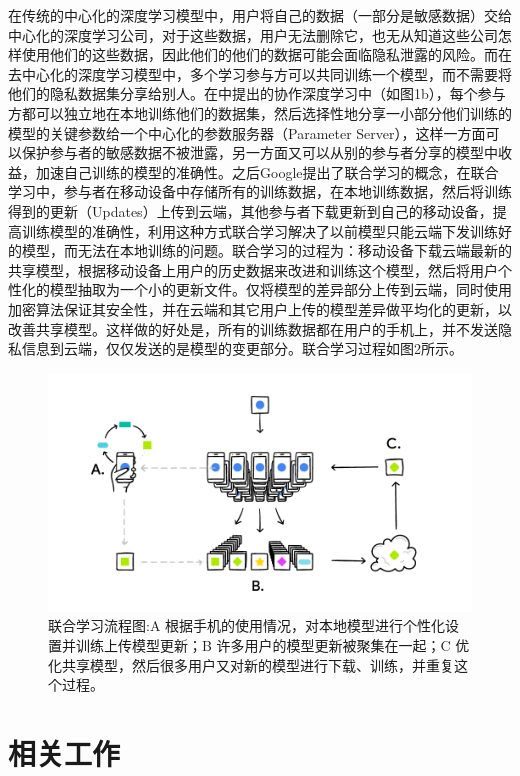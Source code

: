 \documentclass[a4paper]{article}
\begin{document}
在传统的中心化的深度学习模型中，用户将自己的数据（一部分是敏感数据）交给中心化的深度学习公司，对于这些数据，用户无法删除它，也无从知道这些公司怎样使用他们的这些数据，因此他们的他们的数据可能会面临隐私泄露的风险。而在去中心化的深度学习模型中，多个学习参与方可以共同训练一个模型，而不需要将他们的隐私数据集分享给别人。在\cite{shokri2015privacy}中提出的协作深度学习中（如图1b），每个参与方都可以独立地在本地训练他们的数据集，然后选择性地分享一小部分他们训练的模型的关键参数给一个中心化的参数服务器（Parameter Server），这样一方面可以保护参与者的敏感数据不被泄露，另一方面又可以从别的参与者分享的模型中收益，加速自己训练的模型的准确性。之后Google提出了联合学习的概念，在联合学习中，参与者在移动设备中存储所有的训练数据，在本地训练数据，然后将训练得到的更新（Updates）上传到云端，其他参与者下载更新到自己的移动设备，提高训练模型的准确性，利用这种方式联合学习解决了以前模型只能云端下发训练好的模型，而无法在本地训练的问题。联合学习的过程为：移动设备下载云端最新的共享模型，根据移动设备上用户的历史数据来改进和训练这个模型，然后将用户个性化的模型抽取为一个小的更新文件。仅将模型的差异部分上传到云端，同时使用加密算法保证其安全性，并在云端和其它用户上传的模型差异做平均化的更新，以改善共享模型。这样做的好处是，所有的训练数据都在用户的手机上，并不发送隐私信息到云端，仅仅发送的是模型的变更部分。联合学习过程如图2所示。


\begin{figure}[!ht]
\centering
\includegraphics[width = \linewidth]{fig/FederatedLearningFlow}
\caption{联合学习流程图:A 根据手机的使用情况，对本地模型进行个性化设置并训练上传模型更新；B 许多用户的模型更新被聚集在一起；C 优化共享模型，然后很多用户又对新的模型进行下载、训练，并重复这个过程。}
\label{fig:Google}
\end{figure}

\section{相关工作}
\end{document}
